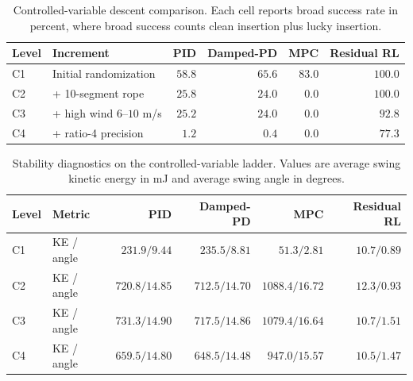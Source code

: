 \documentclass[10pt]{article}
\begin{document}
\begin{table}[t]
\centering
\caption{Controlled-variable descent comparison.  Each cell reports broad success rate in percent, where broad success counts clean insertion plus lucky insertion.}
\label{tab:formal_interval_success}
\footnotesize
\setlength{\tabcolsep}{4.5pt}
\begin{tabular}{llrrrr}
\toprule
Level & Increment & PID & Damped-PD & MPC & Residual RL \\
\midrule
C1 & Initial randomization
   & $58.8$ & $65.6$ & $83.0$ & $\mathbf{100.0}$ \\
C2 & + 10-segment rope
   & $25.8$ & $24.0$ & $0.0$ & $\mathbf{100.0}$ \\
C3 & + high wind $6$--$10$ m/s
   & $25.2$ & $24.0$ & $0.0$ & $\mathbf{92.8}$ \\
C4 & + ratio-4 precision
   & $1.2$ & $0.4$ & $0.0$ & $\mathbf{77.3}$ \\
\bottomrule
\end{tabular}
\end{table}

\begin{table}[t]
\centering
\caption{Stability diagnostics on the controlled-variable ladder.  Values are average swing kinetic energy in mJ and average swing angle in degrees.}
\label{tab:formal_interval_stability}
\footnotesize
\setlength{\tabcolsep}{4.5pt}
\begin{tabular}{llrrrr}
\toprule
Level & Metric & PID & Damped-PD & MPC & Residual RL \\
\midrule
C1 & KE / angle
   & $231.9 / 9.44$ & $235.5 / 8.81$ & $51.3 / 2.81$ & $\mathbf{10.7 / 0.89}$ \\
C2 & KE / angle
   & $720.8 / 14.85$ & $712.5 / 14.70$ & $1088.4 / 16.72$ & $\mathbf{12.3 / 0.93}$ \\
C3 & KE / angle
   & $731.3 / 14.90$ & $717.5 / 14.86$ & $1079.4 / 16.64$ & $\mathbf{10.7 / 1.51}$ \\
C4 & KE / angle
   & $659.5 / 14.80$ & $648.5 / 14.48$ & $947.0 / 15.57$ & $\mathbf{10.5 / 1.47}$ \\
\bottomrule
\end{tabular}
\end{table}
\end{document}
